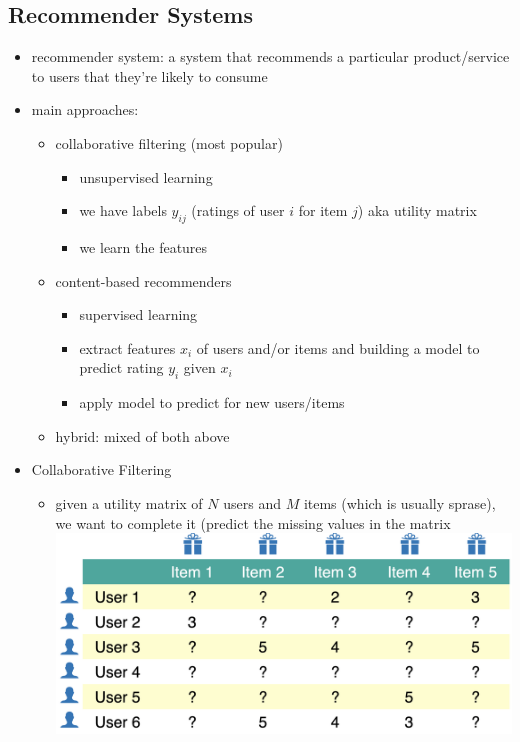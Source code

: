 \documentclass[10.5pt,a4paper, fleqn, dvipsnames]{article}
\begin{document}
\subsection*{Recommender Systems}
\begin{itemize}
    \item recommender system: a system that recommends a particular product/service to users that they're likely to consume
    \item main approaches:
    \begin{itemize}
        \item collaborative filtering (most popular)
        \begin{itemize}[leftmargin = 2em]
            \item unsupervised learning
            \item we have labels $y_{ij}$ (ratings of user $i$ for item $j$) aka utility matrix
            \item we learn the features
        \end{itemize}
        \item content-based recommenders
        \begin{itemize}[leftmargin = 2em]
            \item supervised learning
            \item extract features $x_i$ of users and/or items and building a model to predict rating $y_i$ given $x_i$
            \item apply model to predict for new users/items
        \end{itemize}
        \item hybrid: mixed of both above
    \end{itemize}
    \item Collaborative Filtering
    \begin{itemize}
        \item given a utility matrix of $N$ users and $M$ items (which is usually sprase), we want to complete it (predict the missing values in the matrix \\
        \includegraphics[scale = 0.3]{utility-matrix.png}

\end{itemize}
\end{itemize}
\end{document}
